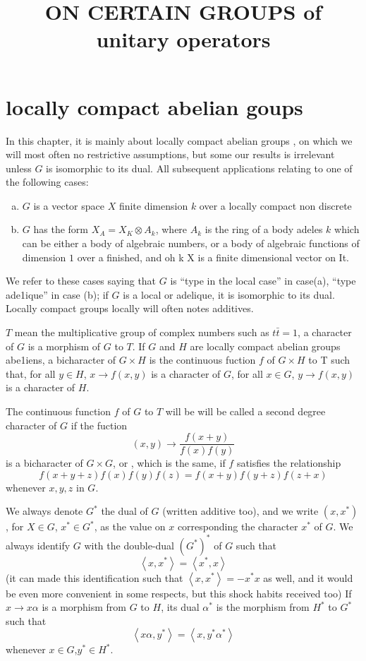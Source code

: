 \documentclass[12pt]{amsart}
\title{ON CERTAIN GROUPS of unitary operators}
\def\inn#1#2{\left\langle{#1},{#2}\right\rangle}
\newcounter{ssection}
\renewcommand{\subsection}{
  \addtocounter{ssection}{1}{\bf  \arabic{ssection}.\  }}
\begin{document}
\maketitle

\section{locally compact abelian goups}

\subsection{}	
In this chapter, it is mainly about locally compact abelian groups ,
 on which we will most often no restrictive assumptions, 
but some our results is irrelevant unless $G$ is isomorphic to its dual.
All subsequent applications relating to one of the following cases:
\begin{enumerate}[(a)]
\item $G$ is a vector space
$X$ finite dimension $k$ over a locally compact non discrete
\item $G$ has the form $X_A=X_K\otimes A_k$, where $A_k$ is the ring
  of a body adeles $k$ which can be either a body of algebraic
  numbers,
  or a body of algebraic functions of dimension $1$ over a finished, 
  and oh k X is a finite dimensional vector on It. 
\end{enumerate}
We refer to these cases
saying that $G$ is ``type in the local case'' in case(a), ``type
ade1ique'' in case (b);
 if $G$ is a local or adelique, 
it is isomorphic to its dual. 
Locally compact groups  locally will often notes additives.

$T$ mean the multiplicative group of complex numbers such as
$t\bar{t}=1$,
 a character of $G$ is a morphism of $G$ to $T$. If $G$ and $H$ 
are locally compact abelian groups abe1iens, a bicharacter of $G\times
H$ is the continuous fuction $f$ of  $G\times H$ to T such that,
 for all $y\in H$, $x \to f(x, y)$ is a character of $G$, for all 
$x\in G$, $y \to f(x,y)$ is a character of $H$.

	
The continuous function $f$ of $G$ to $T$ will be will be called a second
degree character of $G$ if the fuction 
\[
(x, y)\to \frac{f( x + y)}{f(x)f (y)}
\]
is a bicharacter of $G\times G$, or 
, which is the same, if $f$ satisfies the relationship
\[
f (x + y + z) f (x) f(y) f (z) = f(x + y) f (y + z) f (z + x)
\]
whenever $x, y, z$ in $G$.

	
We always denote $G^*$  the dual of $G$ (written additive too), 
and we write
$(x, x^*)$, for $X\in G$, $x^* \in G^*$, as the value on $x$
corresponding the character  $x^*$ of $G$.
We always identify $G$ with the double-dual $(G^*)^*$ of  $G$ such that
\[
\inn{x}{x^*} = \inn{x^*}{x}
\]
(it can made this identification such that
$\inn{x}{x^*} ={-x^*}{x}$ as well, and it would be even more
convenient 
in some respects, 
but this shock habits received too)
If $x\to x\alpha$ is a morphism from $G$ to $H$, its dual $\alpha^*$
is the morphism from $H^*$ to $G^*$ such that 
\[
\inn{x\alpha}{y^*}=\inn{x}{y^*\alpha^*}
\]
whenever $x\in G$,$y^*\in H^*$.
\end{document}
